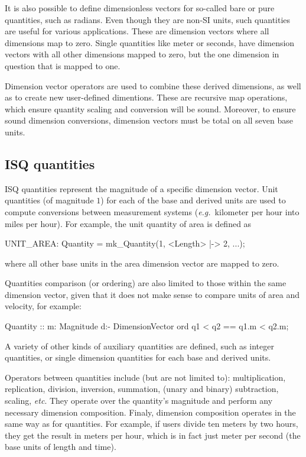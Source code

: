 \documentclass[runningheads,a4paper]{llncs}
\begin{document}
It is also possible to define dimensionless vectors for so-called bare or pure quantities, such as radians. Even though they are non-SI units, such quantities are useful for various applications. These are dimension vectors where all dimensions map to zero. Single quantities like meter or seconds, have dimension vectors with all other dimensions mapped to zero, but the one dimension in question that is mapped to one.  

Dimension vector operators are used to combine these derived dimensions, as well as to create new user-defined dimentions. These are recursive map operations, which ensure quantity scaling and conversion will be sound. Moreover, to ensure sound dimension conversions, dimension vectors must be total on all seven base units.      

\subsection*{ISQ quantities}

ISQ quantities represent the magnitude of a specific dimension vector. Unit quantities (of magnitude \(1\)) for each of the base and derived units are used to compute conversions between measurement systems (\textit{e.g.}~kilometer per hour into miles per hour). For example, the unit quantity of area is defined as
%
\begin{vdmsl}[frame=none,basicstyle=\ttfamily\scriptsize]
    UNIT_AREA: Quantity = mk_Quantity(1, {<Length> |-> 2, ...});
\end{vdmsl}
%
\noindent where all other base units in the area dimension vector are mapped to zero. 

Quantities comparison (or ordering) are also limited to those within the same dimension vector, given that it does not make sense to compare units of area and velocity, for example:
%
\begin{vdmsl}[frame=none,basicstyle=\ttfamily\scriptsize]
    Quantity :: m: Magnitude d:- DimensionVector 
    ord q1 < q2 == q1.m < q2.m; 
\end{vdmsl}
%  
\noindent A variety of other kinds of auxiliary quantities are defined, such as integer quantities, or single dimension quantities for each base and derived units.  

Operators between quantities include (but are not limited to): multiplication, replication, division, inversion, summation, (unary and binary) subtraction, scaling, \textit{etc}. They operate over the quantity's magnitude and perform any necessary dimension composition. Finaly, dimension composition operates in the same way as for quantities. For example, if users divide ten meters by two hours, they get the result in meters per hour, which is in fact just meter per second (the base units of length and time).    
\end{document}
